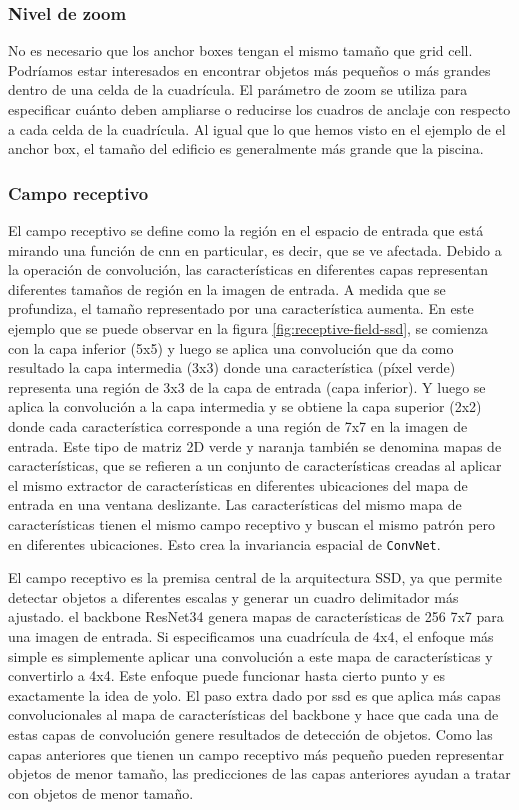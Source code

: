 \subsubsection*{Nivel de zoom}
\label{subsubsec:zoom-level-ssd}

No es necesario que los anchor boxes tengan el mismo tamaño que grid cell. Podríamos estar interesados en encontrar objetos más pequeños o más grandes dentro de una celda de la cuadrícula. El parámetro de zoom se utiliza para especificar cuánto deben ampliarse o reducirse los cuadros de anclaje con respecto a cada celda de la cuadrícula. Al igual que lo que hemos visto en el ejemplo de el anchor box, el tamaño del edificio es generalmente más grande que la piscina.

\subsubsection*{Campo receptivo}
\label{subsubsec:receptive-field-ssd}

El campo receptivo se define como la región en el espacio de entrada que está mirando una función de \gls{cnn} en particular, es decir, que se ve afectada. Debido a la operación de convolución, las características en diferentes capas representan diferentes tamaños de región en la imagen de entrada. A medida que se profundiza, el tamaño representado por una característica aumenta. En este ejemplo que se puede observar en la figura \ref{fig:receptive-field-ssd}, se comienza con la capa inferior (5x5) y luego se aplica una convolución que da como resultado la capa intermedia (3x3) donde una característica (píxel verde) representa una región de 3x3 de la capa de entrada (capa inferior). Y luego se aplica la convolución a la capa intermedia y se obtiene la capa superior (2x2) donde cada característica corresponde a una región de 7x7 en la imagen de entrada. Este tipo de matriz 2D verde y naranja también se denomina mapas de características, que se refieren a un conjunto de características creadas al aplicar el mismo extractor de características en diferentes ubicaciones del mapa de entrada en una ventana deslizante. Las características del mismo mapa de características tienen el mismo campo receptivo y buscan el mismo patrón pero en diferentes ubicaciones. Esto crea la invariancia espacial de \texttt{ConvNet}.

El campo receptivo es la premisa central de la arquitectura SSD, ya que permite detectar objetos a diferentes escalas y generar un cuadro delimitador más ajustado. el backbone ResNet34 genera mapas de características de 256 7x7 para una imagen de entrada. Si especificamos una cuadrícula de 4x4, el enfoque más simple es simplemente aplicar una convolución a este mapa de características y convertirlo a 4x4. Este enfoque puede funcionar hasta cierto punto y es exactamente la idea de \gls{yolo}. El paso extra dado por \gls{ssd} es que aplica más capas convolucionales al mapa de características del backbone y hace que cada una de estas capas de convolución genere resultados de detección de objetos. Como las capas anteriores que tienen un campo receptivo más pequeño pueden representar objetos de menor tamaño, las predicciones de las capas anteriores ayudan a tratar con objetos de menor tamaño.

